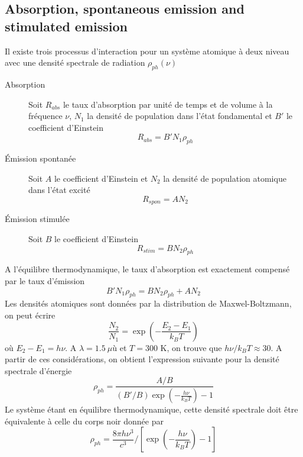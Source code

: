 \subsection{Absorption, spontaneous emission and stimulated emission}
Il existe trois processus d'interaction pour un système atomique à deux niveau avec une 
densité spectrale de radiation $\rho_{ph}(\nu)$
\begin{description}
\item[Absorption] Soit $R_{abs}$ le taux d'absorption par unité de temps et de volume à la fréquence
$\nu$, $N_1$ la densité de population dans l'état fondamental et $B'$ le coefficient d'Einstein
\begin{equation}
{R_{abs}} = B'{N_1}{\rho _{ph}}
\end{equation}
\item[Émission spontanée] Soit $A$ le coefficient d'Einstein et $N_2$ la densité de population atomique
dans l'état excité
\begin{equation}
{R_{spon}} = A{N_2}
\end{equation}
\item[Émission stimulée] Soit $B$ le coefficient d'Einstein
\begin{equation}
{R_{stim}} = B{N_2}{\rho _{ph}}
\end{equation} 
\end{description}
A l'équilibre thermodynamique, le taux d'absorption est exactement compensé par le taux d'émission
\begin{equation}
B'{N_1}{\rho _{ph}} = B{N_2}{\rho _{ph}} + A{N_2}
\end{equation}
Les densités atomiques sont données par la distribution de Maxwel-Boltzmann, on peut écrire
\begin{equation}
\frac{{{N_2}}}{{{N_1}}} = \exp \left( { - \frac{{{E_2} - {E_1}}}{{{k_B}T}}} \right)
\end{equation}
où $E_2-E_1=h\nu$. A $\lambda=1.5\ \mu$ù et $T=300$ K, on trouve que $h\nu/k_BT\approx 30$. A partir
de ces considérations, on obtient l'expression suivante pour la densité spectrale d'énergie
\begin{equation}
{\rho _{ph}} = \frac{{A/B}}{{(B'/B)\exp \left( { - \frac{{h\nu }}{{{k_B}T}}} \right) - 1}}
\end{equation}
Le système étant en équilibre thermodynamique, cette densité spectrale doit être équivalente à celle
du corps noir donnée par
\begin{equation}
{\rho _{ph}} = \frac{{8\pi h{\nu ^3}}}{{{c^3}}}/[\exp \left( { - \frac{{h\nu }}{{{k_B}T}}} \right) - 1]
\end{equation}

